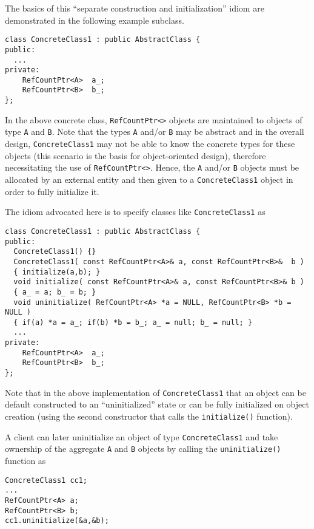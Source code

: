 The basics of this ``separate construction and initialization'' idiom
are demonstrated in the following example subclass.

{\scriptsize\begin{verbatim}
class ConcreteClass1 : public AbstractClass {
public:
  ...
private:
    RefCountPtr<A>  a_;
    RefCountPtr<B>  b_;
};
\end{verbatim}}

{}\noindent{}In the above concrete class, {}\texttt{RefCountPtr<>}
objects are maintained to objects of type {}\texttt{A} and
{}\texttt{B}.  Note that the types {}\texttt{A} and/or {}\texttt{B}
may be abstract and in the overall design, {}\texttt{ConcreteClass1}
may not be able to know the concrete types for these objects (this
scenario is the basis for object-oriented design), therefore
necessitating the use of {}\texttt{RefCountPtr<>}.  Hence, the
{}\texttt{A} and/or {}\texttt{B} objects must be allocated by an
external entity and then given to a {}\texttt{ConcreteClass1} object
in order to fully initialize it.

The idiom advocated here is to specify classes like
{}\texttt{ConcreteClass1} as
%
{\scriptsize\begin{verbatim}
class ConcreteClass1 : public AbstractClass {
public:
  ConcreteClass1() {}
  ConcreteClass1( const RefCountPtr<A>& a, const RefCountPtr<B>&  b )
  { initialize(a,b); }
  void initialize( const RefCountPtr<A>& a, const RefCountPtr<B>& b )
  { a_ = a; b_ = b; }
  void uninitialize( RefCountPtr<A> *a = NULL, RefCountPtr<B> *b = NULL )
  { if(a) *a = a_; if(b) *b = b_; a_ = null; b_ = null; }
  ...
private:
    RefCountPtr<A>  a_;
    RefCountPtr<B>  b_;
};
\end{verbatim}}

Note that in the above implementation of {}\texttt{ConcreteClass1}
that an object can be default constructed to an ``uninitialized''
state or can be fully initialized on object creation (using the second
constructor that calls the {}\texttt{initialize()} function).

A client can later uninitialize an object of type
{}\texttt{Concrete\-Class1} and take ownership of the aggregate
{}\texttt{A} and {}\texttt{B} objects by calling the
{}\texttt{uninitialize()} function as

{\scriptsize\begin{verbatim}
ConcreteClass1 cc1;
...
RefCountPtr<A> a;
RefCountPtr<B> b;
cc1.uninitialize(&a,&b);
\end{verbatim}}

